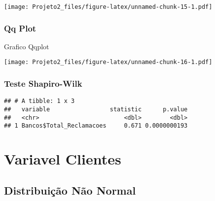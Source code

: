 \documentclass[
]{article}
\newenvironment{Shaded}{\begin{snugshade}}{\end{snugshade}}
\newcommand{\AttributeTok}[1]{\textcolor[rgb]{0.77,0.63,0.00}{#1}}
\newcommand{\FunctionTok}[1]{\textcolor[rgb]{0.00,0.00,0.00}{#1}}
\newcommand{\NormalTok}[1]{#1}
\newcommand{\SpecialCharTok}[1]{\textcolor[rgb]{0.00,0.00,0.00}{#1}}
\newcommand{\StringTok}[1]{\textcolor[rgb]{0.31,0.60,0.02}{#1}}
\begin{document}
\texttt{[image: Projeto2\_files/figure-latex/unnamed-chunk-15-1.pdf]}

\hypertarget{qq-plot-2}{%
\subsubsection{Qq Plot}\label{qq-plot-2}}

Grafico Qqplot

\begin{Shaded}
\end{Shaded}

\texttt{[image: Projeto2\_files/figure-latex/unnamed-chunk-16-1.pdf]}

\hypertarget{teste-shapiro-wilk-2}{%
\subsubsection{Teste Shapiro-Wilk}\label{teste-shapiro-wilk-2}}

\begin{Shaded}
\end{Shaded}

\begin{verbatim}
## # A tibble: 1 x 3
##   variable                 statistic      p.value
##   <chr>                        <dbl>        <dbl>
## 1 Bancos$Total_Reclamacoes     0.671 0.0000000193
\end{verbatim}

\hypertarget{variavel-clientes}{%
\section{Variavel Clientes}\label{variavel-clientes}}

\hypertarget{distribuiuxe7uxe3o-nuxe3o-normal-2}{%
\subsection{Distribuição Não
Normal}\label{distribuiuxe7uxe3o-nuxe3o-normal-2}}
\end{document}
